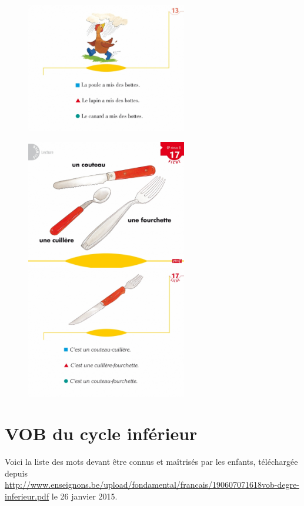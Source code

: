 \begin{center}
\begin{figure}[h]
\begin{minipage}[c]{.46\linewidth}
   \end{minipage}  
   \begin{minipage}[c]{.46\linewidth}
      \includegraphics[width=7cm]{img/CP_niv2_f13verso.jpg}
   \end{minipage}
\end{figure}
\vline
\vline
\begin{figure}[h]
   \begin{minipage}[c]{.46\linewidth}
      \includegraphics[width=7cm]{img/CP_niv3_f17recto.jpg}
   \end{minipage}  
   \begin{minipage}[c]{.46\linewidth}
      \includegraphics[width=7cm]{img/CP_niv3_f17verso.jpg}
   \end{minipage}
\end{figure}
\end{center}

\newpage
\section{VOB du cycle inférieur \label{listeVob}}
Voici la liste des mots devant être connus et maîtrisés par les enfants, téléchargée depuis \url{http://www.enseignons.be/upload/fondamental/francais/190607071618vob-degre-inferieur.pdf} le 26 janvier 2015.


